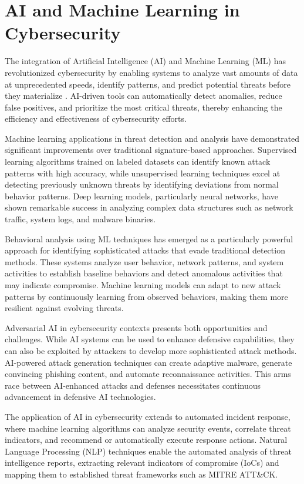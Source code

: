 \section{AI and Machine Learning in Cybersecurity}

The integration of Artificial Intelligence (AI) and Machine Learning (ML) has revolutionized cybersecurity by enabling systems to analyze vast amounts of data at unprecedented speeds, identify patterns, and predict potential threats before they materialize \cite{gizzarelli2024}. AI-driven tools can automatically detect anomalies, reduce false positives, and prioritize the most critical threats, thereby enhancing the efficiency and effectiveness of cybersecurity efforts.

Machine learning applications in threat detection and analysis have demonstrated significant improvements over traditional signature-based approaches. Supervised learning algorithms trained on labeled datasets can identify known attack patterns with high accuracy, while unsupervised learning techniques excel at detecting previously unknown threats by identifying deviations from normal behavior patterns. Deep learning models, particularly neural networks, have shown remarkable success in analyzing complex data structures such as network traffic, system logs, and malware binaries.

Behavioral analysis using ML techniques has emerged as a particularly powerful approach for identifying sophisticated attacks that evade traditional detection methods. These systems analyze user behavior, network patterns, and system activities to establish baseline behaviors and detect anomalous activities that may indicate compromise. Machine learning models can adapt to new attack patterns by continuously learning from observed behaviors, making them more resilient against evolving threats.

Adversarial AI in cybersecurity contexts presents both opportunities and challenges. While AI systems can be used to enhance defensive capabilities, they can also be exploited by attackers to develop more sophisticated attack methods. AI-powered attack generation techniques can create adaptive malware, generate convincing phishing content, and automate reconnaissance activities. This arms race between AI-enhanced attacks and defenses necessitates continuous advancement in defensive AI technologies.

The application of AI in cybersecurity extends to automated incident response, where machine learning algorithms can analyze security events, correlate threat indicators, and recommend or automatically execute response actions. Natural Language Processing (NLP) techniques enable the automated analysis of threat intelligence reports, extracting relevant indicators of compromise (IoCs) and mapping them to established threat frameworks such as MITRE ATT\&CK.

